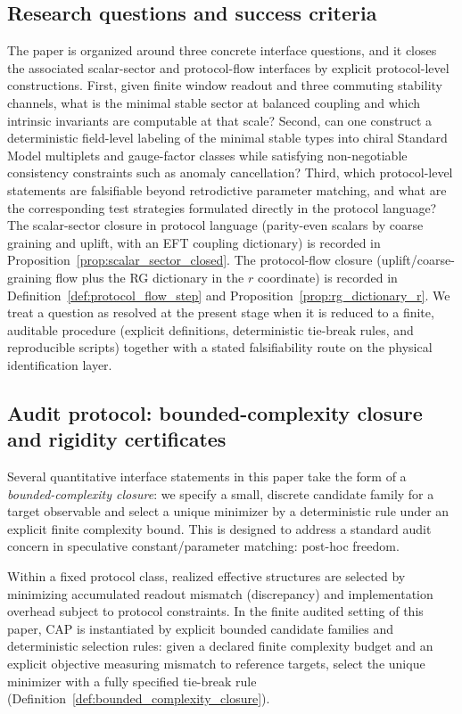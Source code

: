 \subsection{Research questions and success criteria}
\label{subsec:research_questions}
The paper is organized around three concrete interface questions, and it closes the associated scalar-sector and protocol-flow interfaces by explicit protocol-level constructions.
First, given finite window readout and three commuting stability channels, what is the minimal stable sector at balanced coupling and which intrinsic invariants are computable at that scale?
Second, can one construct a deterministic field-level labeling of the minimal stable types into chiral Standard Model multiplets and gauge-factor classes while satisfying non-negotiable consistency constraints such as anomaly cancellation?
Third, which protocol-level statements are falsifiable beyond retrodictive parameter matching, and what are the corresponding test strategies formulated directly in the protocol language?
The scalar-sector closure in protocol language (parity-even scalars by coarse graining and uplift, with an EFT coupling dictionary) is recorded in Proposition~\ref{prop:scalar_sector_closed}.
The protocol-flow closure (uplift/coarse-graining flow plus the RG dictionary in the $r$ coordinate) is recorded in Definition~\ref{def:protocol_flow_step} and Proposition~\ref{prop:rg_dictionary_r}.
We treat a question as resolved at the present stage when it is reduced to a finite, auditable procedure (explicit definitions, deterministic tie-break rules, and reproducible scripts) together with a stated falsifiability route on the physical identification layer.

\subsection{Audit protocol: bounded-complexity closure and rigidity certificates}
\label{subsec:bounded_complexity_audit}

Several quantitative interface statements in this paper take the form of a \emph{bounded-complexity closure}:
we specify a small, discrete candidate family for a target observable and select a unique minimizer by a deterministic rule under an explicit finite complexity bound.
This is designed to address a standard audit concern in speculative constant/parameter matching: post-hoc freedom.

\begin{axiom}\label{ax:cap}
Within a fixed protocol class, realized effective structures are selected by minimizing accumulated readout mismatch (discrepancy) and implementation overhead subject to protocol constraints.
In the finite audited setting of this paper, CAP is instantiated by explicit bounded candidate families and deterministic selection rules: given a declared finite complexity budget and an explicit objective measuring mismatch to reference targets, select the unique minimizer with a fully specified tie-break rule (Definition~\ref{def:bounded_complexity_closure}).
\end{axiom}


